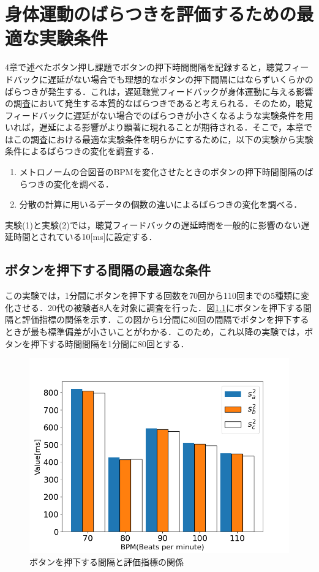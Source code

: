 \chapter{身体運動のばらつきを評価するための最適な実験条件}
4章で述べたボタン押し課題でボタンの押下時間間隔を記録すると，聴覚フィードバックに遅延がない場合でも理想的なボタンの押下間隔にはならずいくらかのばらつきが発生する．これは，遅延聴覚フィードバックが身体運動に与える影響の調査において発生する本質的なばらつきであると考えられる．そのため，聴覚フィードバックに遅延がない場合でのばらつきが小さくなるような実験条件を用いれば，遅延による影響がより顕著に現れることが期待される．そこで，本章ではこの調査における最適な実験条件を明らかにするために，以下の実験から実験条件によるばらつきの変化を調査する．
\begin{enumerate}[leftmargin=*, label=実験(\arabic*)] %
  \item メトロノームの合図音のBPMを変化させたときのボタンの押下時間間隔のばらつきの変化を調べる．
  \item 分散の計算に用いるデータの個数の違いによるばらつきの変化を調べる．
\end{enumerate}
実験(1)と実験(2)では，聴覚フィードバックの遅延時間を一般的に影響のない遅延時間とされている10[ms]に設定する．
\section{ボタンを押下する間隔の最適な条件}
この実験では，1分間にボタンを押下する回数を70回から110回までの5種類に変化させる．20代の被験者8人を対象に調査を行った．図\ref{fig:bpm}にボタンを押下する間隔と評価指標の関係を示す．この図から1分間に80回の間隔でボタンを押下するときが最も標準偏差が小さいことがわかる．このため，これ以降の実験では，ボタンを押下する時間間隔を1分間に80回とする．
\begin{figure}[b]
  \centering
  \includegraphics[scale=0.6]{figures/Yobi/Var/BPM.png}
  \caption{ボタンを押下する間隔と評価指標の関係}
  \label{fig:bpm}
\end{figure}
